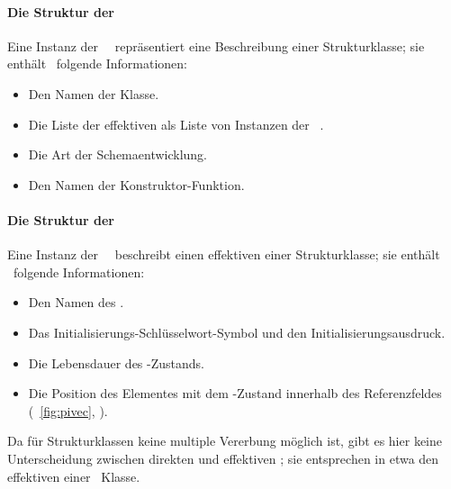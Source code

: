 \paragraph{Die Struktur der
\protect\clsdc\ \protect{}}%
%
Eine Instanz der
\clsdc\ \ repr\"{a}sentiert eine
Beschreibung einer Strukturklasse; sie enth\"{a}lt \ua\ folgende
Informationen:
\begin{itemize}
%
\item Den Namen der Klasse.
%
\item Die Liste der effektiven \Slt[s]\/ als Liste von
Instanzen der \sltdc\ .
%
\item Die Art der Schemaentwicklung.
%
\item Den Namen der Konstruktor-Funktion. 
%
\end{itemize}
%
\paragraph{Die Struktur der
\protect\sltdc\ \protect{}}%
%
Eine Instanz der
\sltdc\ \ beschreibt einen
effektiven \Slt\/ einer Strukturklasse; sie enth\"{a}lt \ua\ folgende
Informationen:
\begin{itemize}
%
\item Den Namen des \Slt[s].
%
\item Das Initialisierungs-Schl\"{u}sselwort-Symbol und den
Initialisierungsausdruck.
%
\item Die Lebensdauer des \Slt\/-Zustands.
%
\item Die Position des Elementes mit dem \Slt\/-Zustand innerhalb des
Referenzfeldes (\figurename~\ref{fig:pivec},
\citepage{\pageref{fig:pivec}}).
%
\end{itemize}
%
\par{}Da f\"{u}r Strukturklassen keine multiple Vererbung m\"{o}glich ist,
gibt es hier keine Unterscheidung zwischen direkten und effektiven
\Slt[s]; sie entsprechen in etwa den effektiven \Slt[s]\/ einer
\clos\ Klasse.
%

